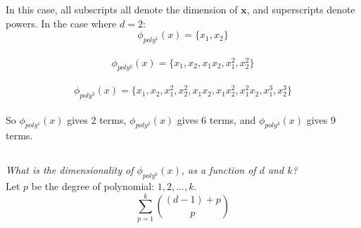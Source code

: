 \documentclass[reqno]{amsart}
\theoremstyle{definition}
\theoremstyle{remark}
\numberwithin{equation}{section}
\begin{document}
In this case, all subscripts all denote the dimension of $\mathbf{x}$, and superscripts denote powers. In the case where $d=2$: \\

\begin{equation}
    \phi_{poly^{1}}(x) = \{ x_1, x_2 \}
\end{equation} \\

\begin{equation}
    \phi_{poly^{2}}(x) = \{ x_1, x_2, x_1 x_2, x_1^{2}, x_2^{2} \}
\end{equation} \\

\begin{equation}
    \phi_{poly^{3}}(x) = \{
        x_1, x_2, 
        x_1^{2}, x_2^{2}, 
        x_1 x_2, x_1 x_2^{2}, x_1^{2} x_2, x_1^{3}, x_2^{3}\}
\end{equation} \\

So $\phi_{poly^{1}}(x)$ gives 2 terms, $\phi_{poly^{2}}(x)$ gives 6 terms, and $\phi_{poly^{3}}(x)$ gives 9 terms. \\

\subsection{}
\textit{What is the dimensionality of $\phi_{poly^k}(x)$, as a function of $d$ and $k$?} \\

Let $p$ be the degree of polynomial: ${1, 2, ..., k}$. \\

\begin{equation}
    \sum_{p=1}^{k} \binom{(d-1)+p}{p} 
\end{equation}
\end{document}
